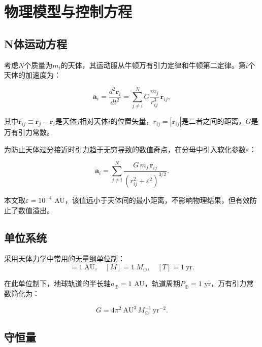 \documentclass[twocolumn,10pt]{article}
\begin{document}
\section{物理模型与控制方程}

\subsection{N体运动方程}

考虑$N$个质量为$m_i$的天体，其运动服从牛顿万有引力定律和牛顿第二定律。第$i$个天体的加速度为：

\begin{equation}
    \mathbf{a}_i = \frac{d^2\mathbf{r}_i}{dt^2}
    = \sum_{j \neq i}^{N} G\frac{m_j}{r_{ij}^3}\,\mathbf{r}_{ij},
    \label{eq:nbody}
\end{equation}

其中$\mathbf{r}_{ij} \equiv \mathbf{r}_j - \mathbf{r}_i$是天体$j$相对天体$i$的位置矢量，$r_{ij} = |\mathbf{r}_{ij}|$是二者之间的距离，$G$是万有引力常数。

为防止天体过分接近时引力趋于无穷导致的数值奇点，在分母中引入软化参数$\varepsilon$：

\begin{equation}
    \mathbf{a}_i = \sum_{j \neq i}^{N} \frac{G\,m_j\,\mathbf{r}_{ij}}
    {(r_{ij}^2 + \varepsilon^2)^{3/2}}.
    \label{eq:nbody_soft}
\end{equation}

本文取$\varepsilon = 10^{-4}$ AU，该值远小于天体间的最小距离，不影响物理结果，但有效防止了数值溢出。

\subsection{单位系统}

采用天体力学中常用的无量纲单位制：
\begin{equation}
    [L] = 1\ \text{AU},\quad
    [M] = 1\ M_\odot,\quad
    [T] = 1\ \text{yr}.
\end{equation}

在此单位制下，地球轨道的半长轴$a_\oplus = 1$ AU，轨道周期$P_\oplus = 1$ yr，万有引力常数简化为：

\begin{equation}
    G = 4\pi^2\ \text{AU}^3\,M_\odot^{-1}\,\text{yr}^{-2}.
\end{equation}

\subsection{守恒量}
\end{document}
